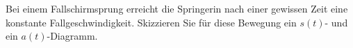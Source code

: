 Bei einem Fallschirmsprung erreicht die Springerin nach einer gewissen Zeit eine konstante Fallgeschwindigkeit. Skizzieren Sie für diese Bewegung ein $s(t)$- und ein $a(t)$-Diagramm.
